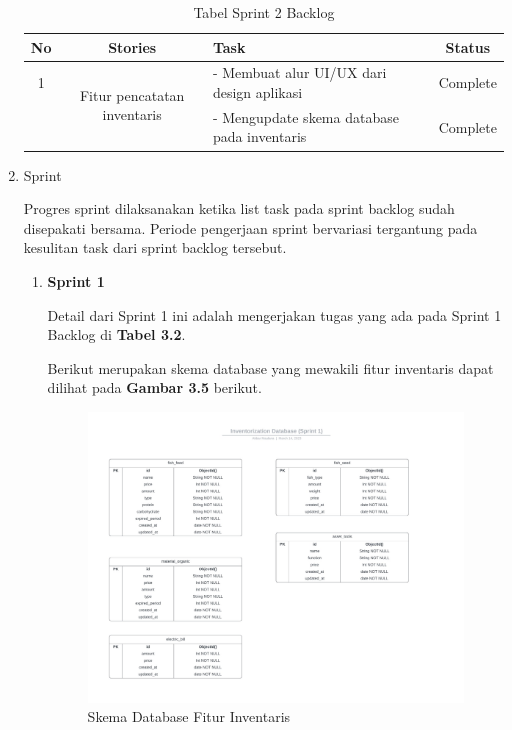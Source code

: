\begin{enumerate}
	\begin{table}[H]	
		\begin{center}
			\caption{Tabel Sprint 2 Backlog}
			\label{tab:table7}
			\begin{tabular}{|c|c|m{13em}|c|}
			\hline
			\textbf{No} & \textbf{Stories} & \textbf{Task} & \textbf{Status} \\
			\hline
			1 & \multirow{2}{10em}{Fitur pencatatan inventaris} & - Membuat alur UI/UX dari design aplikasi & Complete \\
			&  & - Mengupdate skema database pada inventaris & Complete \\ 
			\hline
			\end{tabular}
		\end{center}
	\end{table}

	\item Sprint
	
	Progres sprint dilaksanakan ketika list task pada sprint backlog sudah disepakati bersama. Periode pengerjaan sprint bervariasi tergantung pada kesulitan task dari sprint backlog tersebut.

	\begin{enumerate}
		\item \textbf{Sprint 1}
		
		Detail dari Sprint 1 ini adalah mengerjakan tugas yang ada pada Sprint 1 Backlog di \textbf{Tabel 3.2}.

		Berikut merupakan skema database yang mewakili fitur inventaris dapat dilihat pada \textbf{Gambar 3.5} berikut.
		
		\begin{figure}[H]
			\centering
			\includegraphics[width=1\textwidth]{gambar/sprint1/sprint1_inventaris_database.jpeg}
			\caption{Skema Database Fitur Inventaris}
		\end{figure}
	

\end{enumerate}
\end{enumerate}
